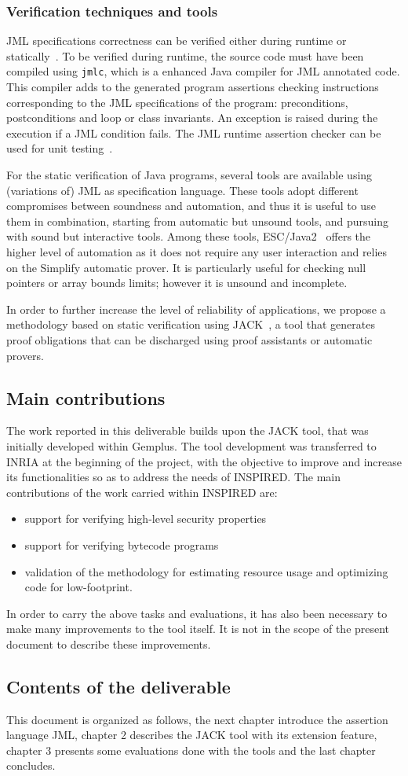 \subsubsection{Verification techniques and tools}

JML specifications correctness can be verified either during runtime
or statically~\cite{BurdyCCEKLLP03}. To be verified during runtime, the
source code must have been compiled using \texttt{jmlc}, which is a
enhanced Java compiler for JML annotated code. This compiler adds to
the generated program assertions checking instructions corresponding
to the JML specifications of the program: preconditions, postconditions 
and loop or class invariants. An exception is raised during the execution 
if a JML condition fails. The JML runtime assertion checker can be used
for unit testing~\cite{CL02:ecoop}.


For the static verification of Java programs, several tools are
available using (variations of) JML as specification language. These
tools adopt different compromises between soundness and automation,
and thus it is useful to use them in combination, starting from
automatic but unsound tools, and pursuing with sound but interactive
tools.  Among these tools, ESC/Java2~\cite{CK04:cassis} offers the higher
level of automation as it does not require any user interaction and
relies on the Simplify automatic prover. It is particularly useful for
checking null pointers or array bounds limits; however it is unsound
and incomplete.

In order to further increase the level of reliability of applications,
we propose a methodology based on static verification using
JACK~\cite{BRL-JACK}, a tool that generates proof obligations that
can be discharged using proof assistants or automatic provers.


\subsection{Main contributions}
The work reported in this deliverable builds upon the JACK tool,
that was initially developed within Gemplus. The tool development
was transferred to INRIA at the beginning of the project, with
the objective to improve and increase its functionalities so as
to address the needs of INSPIRED. The main contributions of the
work carried within INSPIRED are:
\begin{itemize}
\item support for verifying high-level security properties
\item support for verifying bytecode programs
\item validation of the methodology for estimating resource
usage and optimizing code for low-footprint.
\end{itemize}
In order to carry the above tasks and evaluations, it has also
been necessary to make many improvements to the tool itself.
It is not in the scope of the present document to describe these 
improvements.


\subsection{Contents of the deliverable}
This document is organized as follows, the next chapter introduce the
assertion language JML, chapter 2 describes the JACK tool with its
extension feature, chapter 3 presents some evaluations done with the
tools and the last chapter concludes.
